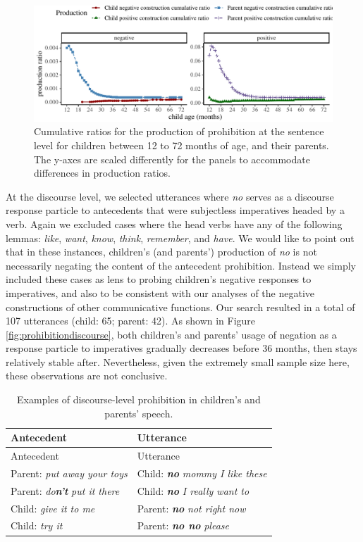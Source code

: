 \documentclass[
  english,
  man,floatsintext]{apa6}
\begin{document}
\begin{figure}[H]

{\centering \includegraphics{neg_construction_article_files/figure-latex/prohibition-1} 

}

\caption{Cumulative ratios for the production of prohibition at the sentence level for children between 12 to 72 months of age, and their parents. The y-axes are scaled differently for the panels to accommodate differences in production ratios.}\label{fig:prohibition}
\end{figure}

At the discourse level, we selected utterances where \emph{no} serves as a discourse response particle to antecedents that were subjectless imperatives headed by a verb. Again we excluded cases where the head verbs have any of the following lemmas: \emph{like}, \emph{want}, \emph{know}, \emph{think}, \emph{remember}, and \emph{have}. We would like to point out that in these instances, children's (and parents') production of \emph{no} is not necessarily negating the content of the antecedent prohibition. Instead we simply included these cases as lens to probing children's negative responses to imperatives, and also to be consistent with our analyses of the negative constructions of other communicative functions. Our search resulted in a total of 107 utterances (child: 65; parent: 42).
As shown in Figure \ref{fig:prohibitiondiscourse}, both children's and parents' usage of negation as a response particle to imperatives gradually decreases before 36 months, then stays relatively stable after. Nevertheless, given the extremely small sample size here, these observations are not conclusive.

\begin{longtable}[]{@{}ll@{}}
\caption{\label{tab:disprohib} Examples of discourse-level prohibition in children's and parents' speech.}\tabularnewline
\toprule
Antecedent & Utterance \\
\midrule
\endfirsthead
\toprule
Antecedent & Utterance \\
\midrule
\endhead
Parent: \emph{put away your toys} & Child: \textbf{\emph{no}} \emph{mommy I like these} \\
Parent: \emph{do}\textbf{\emph{n't}} \emph{put it there} & Child: \textbf{\emph{no}} \emph{I really want to} \\
Child: \emph{give it to me} & Parent: \textbf{\emph{no}} \emph{not right now} \\
Child: \emph{try it} & Parent: \textbf{\emph{no no}} \emph{please} \\
\bottomrule
\end{longtable}
\end{document}
